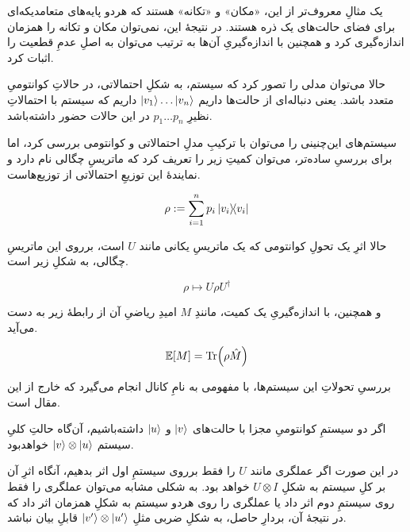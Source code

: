 \documentclass[a4paper,12pt]{article}
\begin{document}
یک مثالِ معروف‌تر از این، «مکان» و «تکانه» هستند که هردو پایه‌های متعامد‌یکه‌ای برای فضای حالت‌های یک ذره هستند. در نتیجهٔ این، نمی‌توان مکان و تکانه را همزمان اندازه‌گیری کرد و همچنین با اندازه‌گیریِ آن‌ها به ترتیب می‌توان به اصلِ عدمِ قطعیت 
را اثبات کرد.


حالا می‌توان مدلی را تصور کرد که سیستم، به شکلِ احتمالاتی، در حالاتِ کوانتومیِ متعدد باشد. یعنی دنباله‌ای از حالت‌ها داریم 
\(\ket{v_1}\dots \ket{v_n} \)
داریم که سیستم با احتمالاتِ نظیرِ
\( p_1 \dots p_n \)
در این حالات حضور داشته‌باشد.

سیستم‌های این‌چنینی را می‌توان با ترکیبِ مدلِ احتمالاتی و کوانتومی بررسی کرد، اما برای بررسیِ ساده‌تر، می‌توان کمیتِ زیر را تعریف کرد که ماتریسِ چگالی نام دارد و نمایندهٔ این توزیعِ احتمالاتی از توزیع‌هاست.

\begin{equation} \rho := \sum_{i=1}^n p_i \dyad{v_i} \end{equation}

حالا اثرِ یک تحولِ کوانتومی که یک ماتریسِ یکانی مانند \(U\) است، برروی این ماتریسِ چگالی، به شکلِ زیر است.

\begin{equation} \rho \mapsto U \rho U^\dagger \end{equation}

و همچنین، با اندازه‌گیریِ یک کمیت، مانندِ 
\(M\)
امیدِ ریاضیِ آن از رابطهٔ زیر به دست می‌آید.

\begin{equation}  \mathbb{E}[M] = \Tr(\rho \hat M)\end{equation}

بررسیِ تحولاتِ این سیستم‌ها، با مفهومی به نامِ کانال انجام می‌گیرد که خارج از این مقال است.


اگر دو سیستمِ کوانتومیِ مجزا با حالت‌های 
\(\ket{v}\)
و
\(\ket{u}\)
 داشته‌باشیم، آن‌گاه حالتِ کلیِ سیستم
\( \ket{v}\otimes\ket{u} \)
خواهدبود.

در این صورت اگر عملگری مانند \(U\) را فقط برروی سیستمِ اول اثر بدهیم، آنگاه اثرِ آن بر کلِ سیستم به شکلِ
\(U \otimes I\)
خواهد بود. به شکلی مشابه می‌توان عملگری را فقط روی سیستمِ دوم اثر داد یا عملگری را روی هردو سیستم به شکلِ همزمان اثر داد که در نتیجهٔ آن، بردارِ حاصل، به شکلِ ضربی مثلِ 
\( \ket{v'}\otimes\ket{u'} \)
قابلِ بیان نباشد.
\end{document}

